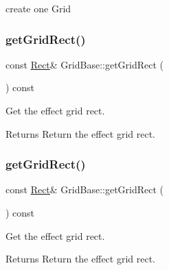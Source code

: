create one Grid \mbox{\label{classGridBase_a7c4baef8d6d3dca82a01c405b5b53d2d}} 
\subsubsection{\texorpdfstring{get\+Grid\+Rect()}{getGridRect()}\hspace{0.1cm}{\footnotesize\ttfamily [1/2]}}
{\footnotesize\ttfamily const \hyperlink{classRect}{Rect}\& Grid\+Base\+::get\+Grid\+Rect (\begin{DoxyParamCaption}{ }\end{DoxyParamCaption}) const\hspace{0.3cm}{\ttfamily [inline]}}



Get the effect grid rect. 

\begin{DoxyReturn}{Returns}
Return the effect grid rect. 
\end{DoxyReturn}
\mbox{\label{classGridBase_a7c4baef8d6d3dca82a01c405b5b53d2d}} 
\subsubsection{\texorpdfstring{get\+Grid\+Rect()}{getGridRect()}\hspace{0.1cm}{\footnotesize\ttfamily [2/2]}}
{\footnotesize\ttfamily const \hyperlink{classRect}{Rect}\& Grid\+Base\+::get\+Grid\+Rect (\begin{DoxyParamCaption}{ }\end{DoxyParamCaption}) const\hspace{0.3cm}{\ttfamily [inline]}}



Get the effect grid rect. 

\begin{DoxyReturn}{Returns}
Return the effect grid rect. 
\end{DoxyReturn}
\mbox{\label{classGridBase_af251b629a734cb018d13b332c05a4724}} 
